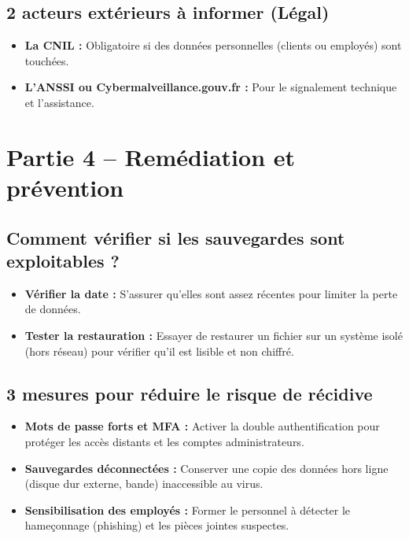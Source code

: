 \documentclass[a4paper,12pt]{article}
\begin{document}
\subsection*{2 acteurs extérieurs à informer (Légal)}
\begin{itemize}
    \item \textbf{La CNIL :} Obligatoire si des données personnelles (clients ou employés) sont touchées.
    \item \textbf{L'ANSSI ou Cybermalveillance.gouv.fr :} Pour le signalement technique et l'assistance.
\end{itemize}

\section{Partie 4 -- Remédiation et prévention}

\subsection*{Comment vérifier si les sauvegardes sont exploitables ?}
\begin{itemize}
    \item \textbf{Vérifier la date :} S'assurer qu'elles sont assez récentes pour limiter la perte de données.
    \item \textbf{Tester la restauration :} Essayer de restaurer un fichier sur un système isolé (hors réseau) pour vérifier qu'il est lisible et non chiffré.
\end{itemize}

\subsection*{3 mesures pour réduire le risque de récidive}
\begin{itemize}
    \item \textbf{Mots de passe forts et MFA :} Activer la double authentification pour protéger les accès distants et les comptes administrateurs.
    \item \textbf{Sauvegardes déconnectées :} Conserver une copie des données hors ligne (disque dur externe, bande) inaccessible au virus.
    \item \textbf{Sensibilisation des employés :} Former le personnel à détecter le hameçonnage (phishing) et les pièces jointes suspectes.
\end{itemize}
\end{document}
